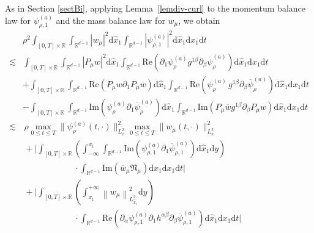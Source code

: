 \documentclass[11pt,letterpaper,reqno]{amsart}
\numberwithin{equation}{section}
\theoremstyle{definition}
\theoremstyle{remark}
\begin{document}
As in Section \ref{sectBi},  applying Lemma~\ref{lemdiv-curl} to  the  momentum balance law for \(\psi_{\rho,1}^{(a)}\) and the mass balance
law for \(w_\mu\), we obtain
\begin{align}
& \rho^2 \int_{[0,T]\times \mathbb{R}} \int_{\mathbb{R}^{d-1}} |  w_\mu   |^2 	\mathrm{d} \widehat{x}_1 \int_{\mathbb{R}^{d-1}} |  \psi_{\rho,1}^{(a)} |^2 \mathrm{d} \widehat{x}_1 \mathrm{ d} x_1 \mathrm{ d} t \\
\lesssim&\int_{[0,T]\times \mathbb{R}} \int_{\mathbb{R}^{d-1}} |  P_\mu  w |^2 	\mathrm{d} \widehat{x}_1 \int_{\mathbb{R}^{d-1}} \mathrm{Re} (\partial_{1} \psi_\rho^{(a)}   g^{1\beta} \partial_{\beta} \overline{\psi}_{\rho}^{(a)} ) \mathrm{d} \widehat{x}_1 \mathrm{ d} x_1 \mathrm{ d} t \nonumber\\
&+\int_{[0,T]\times \mathbb{R}} \int_{\mathbb{R}^{d-1}} \mathrm{Re} (    P_\mu w \partial_{1} P_\mu  \overline{w}   )	\mathrm{d} \widehat{x}_1 \int_{\mathbb{R}^{d-1}} \mathrm{Re} (\psi_\rho^{(a)} \,   g^{1\beta} \partial_{\beta} \overline{\psi}_{\rho}^{(a)} ) \mathrm{d} \widehat{x}_1 \mathrm{ d} x_1 \mathrm{ d} t\nonumber\\
&-\int_{[0,T]\times \mathbb{R}}  \int_{\mathbb{R}^{d-1}}  \mathrm{Im} ( \psi_{\rho }^{(a)} \partial_{1} \overline{\psi}_\rho^{(a)} ) \mathrm{d} \widehat{x}_1 \int_{\mathbb{R}^{d-1}}\mathrm{Im} ( P_\mu \overline{w} g^{1\beta}    \partial_{\beta}P_\mu  w   ) \mathrm{d} \widehat{x}_1 \mathrm{ d} x_1 \mathrm{ d} t \nonumber \\
\lesssim &\,\rho \max_{0\leq t \leq T} \| \psi_\rho^{(a)} (t, \cdot) \|_{  L_x^2}^2  \max_{0\leq t \leq T} \|    w_\mu(t,\cdot )\|_{ L_x^2}^2 \label{diff.1biNt}\\
	&\,+\Big|\int_{[0,T]\times \mathbb{R}}  \left( \int_{-\infty}^{x_1} \int_{\mathbb{R}^{d-1}}  \mathrm{Im}\left( \psi_{\rho,1 }^{(a)} \partial_{1} \overline{\psi}_{\rho,1}^{(a)}\right) 
 \mathrm{d} \widehat{x}_1 \mathrm{ d} y\right) \label{non.uni.bit1}\\
 &\qquad\qquad\qquad  \cdot\int_{\mathbb{R}^{d-1}} \mathrm{Im} \left( \overline{ w}_\mu  \mathfrak{N}_\mu    \right) \mathrm{d} \widehat{x}_1 \mathrm{ d} x_1 \mathrm{ d} t\Big| \nonumber\\
	&\,+\Big|\int_{[0,T]\times \mathbb{R}}  \left( \int^{+\infty}_{x_1}   \left\|w_\mu\right\|^2_{L^2_{\widehat{x}_1}}   \mathrm{ d} y\right )\label{non.uni.bit2}\\
 &\qquad\qquad\qquad  \cdot\int_{\mathbb{R}^{d-1}}  \mathrm{Re}\left(\partial_{\alpha} \psi_{\rho,1}^{(a)}   \partial_1 h^{\alpha \beta} \partial_\beta \overline{\psi}^{(a)}_{\rho,1}\right)  \mathrm{d} \widehat{x}_1\mathrm{ d} x_1 \mathrm{ d} t \Big|\nonumber\\

\end{align}
\end{document}
